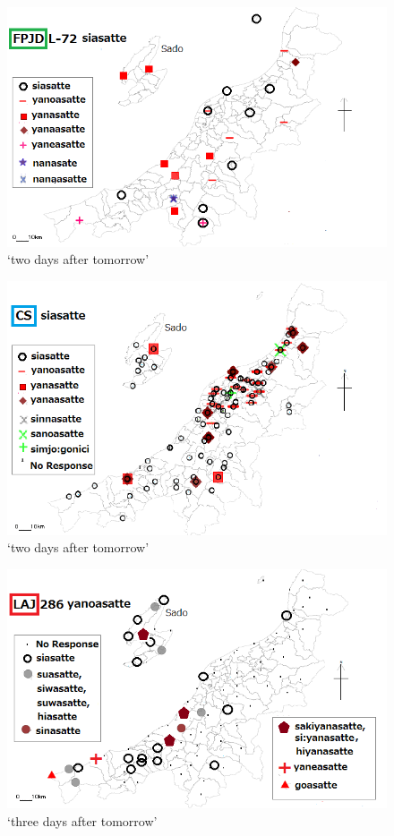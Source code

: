 \documentclass[output=paper]{LSP/langsci}
\begin{document}
\begin{figure}
\includegraphics[width=.75\textwidth]{illustrations/fuku2_fig5b}
\caption{`two days after tomorrow'}
\label{fig:5b}
\end{figure}

\begin{figure}
\includegraphics[width=.75\textwidth]{illustrations/fuku2_fig5c}
\caption{`two days after tomorrow'}
\label{fig:5c}
\end{figure}

\begin{figure}
\includegraphics[width=.75\textwidth]{illustrations/fuku2_fig6a}
\caption{`three days after tomorrow'}
\label{fig:6a}
\end{figure}
\end{document}
